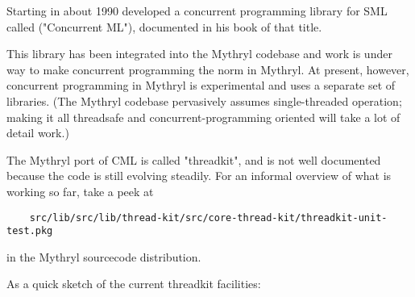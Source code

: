 Starting in about 1990  developed a 
concurrent programming library for SML called  ("Concurrent ML"), 
documented in his book of that title.

This library has been integrated into the Mythryl codebase and work is under way 
to make concurrent programming the norm in Mythryl.  At present, however, concurrent 
programming in Mythryl is experimental and uses a separate set of libraries.  (The 
Mythryl codebase pervasively assumes single-threaded operation;  making it all 
threadsafe and concurrent-programming oriented will take a lot of detail work.)

The Mythryl port of CML is called "threadkit", and is not well documented because 
the code is still evolving steadily.  For an informal overview of what is working 
so far, take a peek at 

\begin{verbatim}
    src/lib/src/lib/thread-kit/src/core-thread-kit/threadkit-unit-test.pkg
\end{verbatim}

in the Mythryl sourcecode distribution.

As a quick sketch of the current threadkit facilities:

